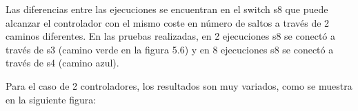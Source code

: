 \documentclass[a4paper, 12pt]{book}
\begin{document}
 	Las diferencias entre las ejecuciones se encuentran en el switch s8 que puede alcanzar
 	el controlador con el mismo coste en número de saltos a través de 2 caminos diferentes.
 	En las pruebas realizadas, en 2 ejecuciones s8 se conectó a través de s3 (camino verde
 	en la figura 5.6)	y en 8 ejecuciones s8 se conectó a través de s4 (camino	azul).
 	
 	Para el caso de 2 controladores, los resultados son muy variados, como se muestra en la siguiente figura:
 	
 	\begin{figure}[H]
 		\centering
 		
 		\hfill
 		\hfill
 		\vspace{10pt} %
 		\hfill
 		\vspace{10pt} %
 		

\end{figure}
\end{document}
